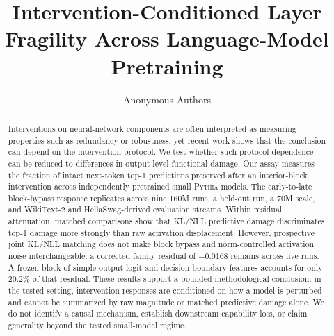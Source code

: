 \documentclass{article}
\title{Intervention-Conditioned Layer Fragility Across Language-Model Pretraining}
\author{Anonymous Authors}
\newcommand{\model}{\textsc{Pythia}}
\begin{document}
\maketitle

\begin{abstract}
Interventions on neural-network components are often interpreted as measuring
properties such as redundancy or robustness, yet recent work shows that the
conclusion can depend on the intervention protocol. We test whether such
protocol dependence can be reduced to differences in output-level functional
damage. Our assay measures the fraction of intact next-token top-1 predictions
preserved after an interior-block intervention across independently pretrained
small \model{} models. The early-to-late block-bypass response replicates across
nine 160M runs, a held-out run, a 70M scale, and WikiText-2 and HellaSwag-derived
evaluation streams. Within residual attenuation, matched comparisons show that
KL/NLL predictive damage discriminates top-1 damage more strongly than raw
activation displacement. However, prospective joint KL/NLL matching does not
make block bypass and norm-controlled activation noise interchangeable: a
corrected family residual of $-0.0168$ remains across five runs. A frozen block
of simple output-logit and decision-boundary features accounts for only 20.2\%
of that residual. These results support a bounded methodological conclusion:
in the tested setting, intervention responses are conditioned on how a model is
perturbed and cannot be summarized by raw magnitude or matched predictive
damage alone. We do not identify a causal mechanism, establish downstream
capability loss, or claim generality beyond the tested small-model regime.
\end{abstract}















\appendix

\end{document}
